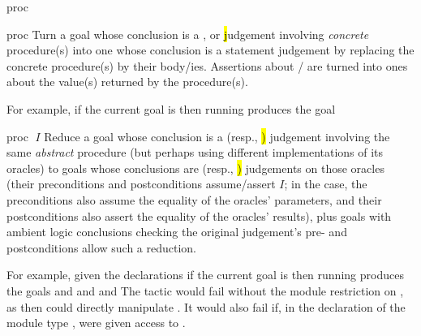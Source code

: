 \begin{tactic}{proc}
  \begin{tsyntax}{proc}
    Turn a goal whose conclusion is a \prhl, \phl or \hl judgement
    involving \emph{concrete} procedure(s) into one whose conclusion
    is a statement judgement by replacing the concrete procedure(s) by
    their body/ies. Assertions about / are turned
    into ones about the value(s) returned by the procedure(s).

  \bigskip
  For example, if the current goal is
   then
  running 
  produces the goal
  \end{tsyntax}

  \begin{tsyntax}{proc $\;I$}
    Reduce a goal whose conclusion is a \prhl (resp., \hl) judgement
    involving the same \emph{abstract} procedure (but perhaps using
    different implementations of its oracles) to goals whose
    conclusions are \prhl (resp., \hl) judgements on those oracles
    (their preconditions and postconditions assume/assert $I$; in
    the \prhl case, the preconditions also assume the equality of the
    oracles' parameters, and their postconditions also assert the
    equality of the oracles' results), plus goals with ambient logic
    conclusions checking the original judgement's pre- and
    postconditions allow such a reduction.

  \bigskip
  For example, given the declarations
  if the current goal is
   then
  running 
  produces the goals
  and
  and
  and
  The tactic would fail without the module restriction  on
  , as then  could directly manipulate .
  It would also fail if, in the declaration of the module type ,
   were given access to .
  \end{tsyntax}


\end{tactic}
